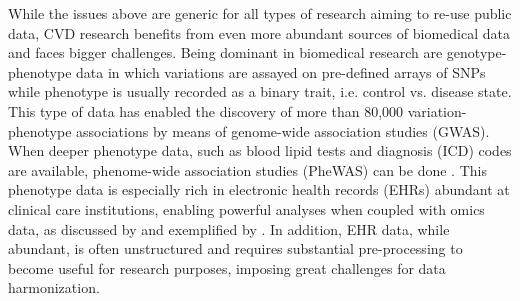 \documentclass[letter]{bioinfo}
\begin{document}
	
    While the issues above are generic for all types of research aiming to re-use public data, CVD research benefits from even more abundant sources of biomedical data and faces bigger challenges. Being dominant in biomedical research are genotype-phenotype data in which variations are assayed on pre-defined arrays of SNPs while phenotype is usually recorded as a binary trait, i.e. control vs. disease state. This type of data has enabled the discovery of more than 80,000 variation-phenotype associations by means of genome-wide association studies (GWAS). When deeper phenotype data, such as blood lipid tests and diagnosis (ICD) codes are available, phenome-wide association studies (PheWAS) can be done \citep{Denny:2013:Systematic}. This phenotype data is especially rich in electronic health records (EHRs) abundant at clinical care institutions, enabling powerful analyses when coupled with omics data, as discussed by \cite{Denaxas:2015:Big, Wu:2017:Omic} and exemplified by \cite{Dewey:2016:Distribution,Li:2018:Decoding}. In addition, EHR data, while abundant, is often unstructured and requires substantial pre-processing to become useful for research purposes, imposing great challenges for data harmonization.
	
	
\end{document}
